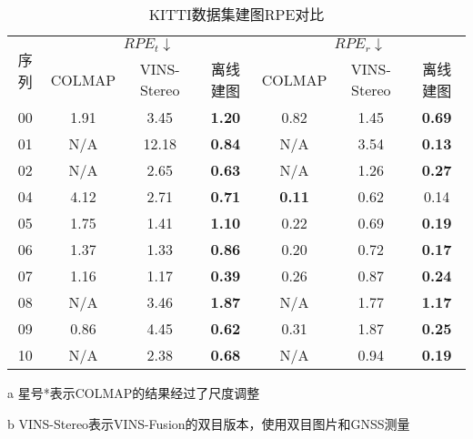 \begin{table}
\centering
\begin{threeparttable}
\caption{KITTI数据集建图RPE\textdownarrow{}对比}
\begin{tabular}{c|ccc|ccc}
\toprule
\multirow{2}{*}{序列} & \multicolumn{3}{c|}{$RPE_t \downarrow$}              & \multicolumn{3}{c}{$RPE_r\downarrow$}                    \\ \cline{2-7} 
                    & COLMAP & VINS-Stereo & 离线建图          & COLMAP       & VINS-Stereo & 离线建图  \\
\midrule
00                  & 1.91    & 3.45        & \cellcolor[HTML]{FA7F6F}\textbf{1.20} & 0.82          & 1.45        & \cellcolor[HTML]{FA7F6F}\textbf{0.69} \\
01                  & N/A     & 12.18       & \cellcolor[HTML]{FA7F6F}\textbf{0.84} & N/A           & 3.54        & \cellcolor[HTML]{FA7F6F}\textbf{0.13} \\
02                  & N/A     & 2.65        & \cellcolor[HTML]{FA7F6F}\textbf{0.63} & N/A           & 1.26        & \cellcolor[HTML]{FA7F6F}\textbf{0.27} \\
04                  & 4.12    & 2.71        & \cellcolor[HTML]{FA7F6F}\textbf{0.71} & \cellcolor[HTML]{FA7F6F}\textbf{0.11} & 0.62        & 0.14          \\
05                  & 1.75    & 1.41        & \cellcolor[HTML]{FA7F6F}\textbf{1.10} & 0.22          & 0.69        & \cellcolor[HTML]{FA7F6F}\textbf{0.19} \\
06                  & 1.37    & 1.33        & \cellcolor[HTML]{FA7F6F}\textbf{0.86} & 0.20          & 0.72        & \cellcolor[HTML]{FA7F6F}\textbf{0.17} \\
07                  & 1.16    & 1.17        & \cellcolor[HTML]{FA7F6F}\textbf{0.39} & 0.26          & 0.87        & \cellcolor[HTML]{FA7F6F}\textbf{0.24} \\
08                  & N/A     & 3.46        & \cellcolor[HTML]{FA7F6F}\textbf{1.87} & N/A           & 1.77        & \cellcolor[HTML]{FA7F6F}\textbf{1.17} \\
09                  & 0.86    & 4.45        & \cellcolor[HTML]{FA7F6F}\textbf{0.62} & 0.31          & 1.87        & \cellcolor[HTML]{FA7F6F}\textbf{0.25} \\
10                  & N/A     & 2.38        & \cellcolor[HTML]{FA7F6F}\textbf{0.68} & N/A           & 0.94        & \cellcolor[HTML]{FA7F6F}\textbf{0.19} \\ \bottomrule
\end{tabular}
\label{tab:map_rpe}
\begin{tablenotes}
  \item [a] 星号*表示COLMAP的结果经过了尺度调整
  \item [b] VINS-Stereo表示VINS-Fusion的双目版本，使用双目图片和GNSS测量
\end{tablenotes}
\end{threeparttable}
\end{table}

